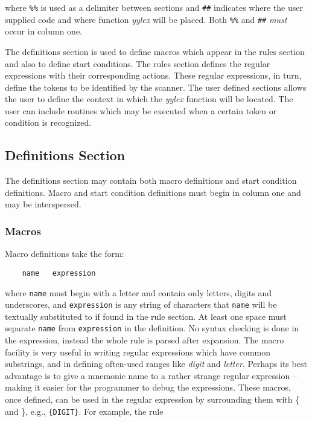 where \verb|%%| is used as a delimiter between sections  and \verb|##| 
indicates where the user supplied code and where function {\sl yylex} 
will be placed.  Both \verb|%%| 
and \verb|##| {\it must} occur in column one.

\mysk
The definitions section is used to define macros which appear in the rules 
section and also to define start conditions.  The rules section defines the 
regular expressions with their corresponding actions.  These regular 
expressions, in turn, define the tokens to be identified by the scanner.
The user defined sections allows the user to define the context in which the 
{\sl yylex} function will be located.  The user can include routines which
may be executed when a certain token or condition is recognized.  


\subsection{Definitions Section}

The definitions section may contain both macro definitions and
start condition definitions.  Macro and start condition definitions
must begin in column one and may be interspersed.

\subsubsection{Macros}
Macro definitions take the form:

\small
\begin{verbatim}
    name   expression
\end{verbatim}
\normalsize

where {\tt name} must begin with a letter and contain only letters,
digits and underscores, and {\tt expression} is
any string of characters that {\tt name} will be textually substituted to 
if found in the rule section.  At least one space must separate {\tt name} 
from {\tt expression} in the definition.  No syntax checking is done in 
the expression, instead the whole rule is parsed after expansion.
The macro facility is very useful in writing regular expressions which
have common substrings, and in defining often-used ranges like {\it digit} 
and {\it letter}.
Perhaps its best advantage is to give a mnemonic name to a rather strange
regular expression -- making it easier for the programmer to debug the
expressions.  These macros, once defined, can be used in the
regular expression by surrounding them with \{ and \}, e.g., \verb|{DIGIT}|.
For example, the rule

